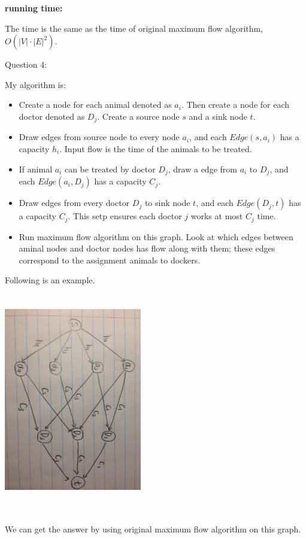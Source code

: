 \documentclass[12pt]{article}
\begin{document}
\textbf{running time:} \par
The time is the same as the time of original maximum flow algorithm, $O(|V|\cdot|E|^2)$.



\pagebreak
\noindent
\large Question 4: \par
\normalsize 
My algorithm is: 

\begin{itemize}
  \item Create a node for each animal denoted as $a_i$. Then create a node for each doctor denoted as $D_j$. Create a source node $s$ and a sink node $t$. 
  \item Draw edges from source node to every node $a_i$, and each $Edge(s, a_i)$ has a capacity $h_i$.
	Input flow is the time of the animals to be treated.
  \item If animal $a_i$ can be treated by doctor $D_j$, draw a edge from $a_i$ to $D_j$, and each $Edge(a_i, D_j)$ has a capacity $C_j$.
  \item Draw edges from every doctor $D_j$ to sink node $t$, and each $Edge(D_j, t)$ has a capacity $C_j$. 
	This setp ensures each doctor $j$ works at most $C_j$ time. 
  \item Run maximum flow algorithm on this graph. 
	Look at which edges between aminal nodes and doctor nodes has flow along with them; 
	these edges correspond to the assignment animals to dockers.

\end{itemize}

Following is an example. \\
\includegraphics[width=6cm, height=10cm, angle=90,origin=c]{question4}
\par
We can get the answer by using original maximum flow algorithm on this graph.
\\
\end{document}
